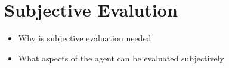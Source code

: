 \documentclass[english, version-2022-01]{uzl-thesis}
\begin{document}
\section{Subjective Evalution}

\begin{itemize}
	\item Why is subjective evaluation needed
	\item What aspects of the agent can be evaluated subjectively
\end{itemize}








\end{document}
